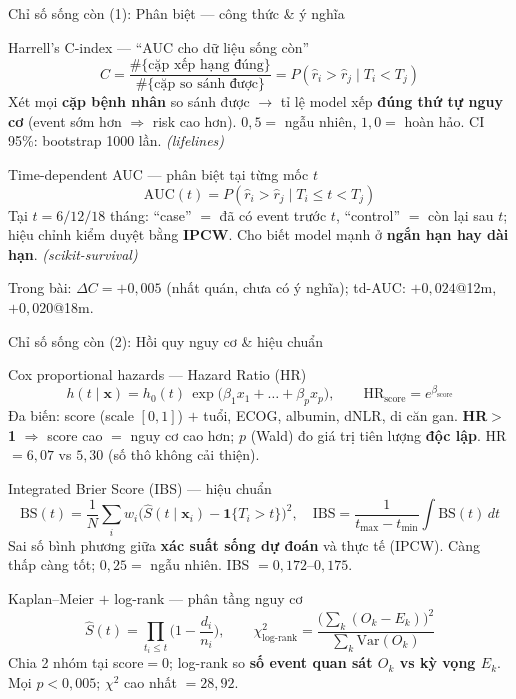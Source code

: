 \documentclass[aspectratio=169,11pt]{beamer}
\begin{document}
\begin{frame}{Chỉ số sống còn (1): Phân biệt --- công thức \& ý nghĩa}
  \small
  \begin{block}{Harrell's C-index --- ``AUC cho dữ liệu sống còn''}
    \[
      C=\frac{\#\{\text{cặp xếp hạng đúng}\}}{\#\{\text{cặp so sánh được}\}}
       = P\!\left(\hat r_i>\hat r_j \mid T_i<T_j\right)
    \]
    Xét mọi \textbf{cặp bệnh nhân} so sánh được $\rightarrow$ tỉ lệ model xếp \textbf{đúng thứ tự nguy cơ}
    (event sớm hơn $\Rightarrow$ risk cao hơn). \;$0{,}5=$ ngẫu nhiên, $1{,}0=$ hoàn hảo.
    CI 95\%: bootstrap 1000 lần. \hfill\textit{(lifelines)}
  \end{block}
  \begin{block}{Time-dependent AUC --- phân biệt tại từng mốc $t$}
    \[
      \mathrm{AUC}(t)=P\!\left(\hat r_i>\hat r_j \mid T_i\le t< T_j\right)
    \]
    Tại $t=6/12/18$ tháng: ``case'' $=$ đã có event trước $t$, ``control'' $=$ còn lại sau $t$;
    hiệu chỉnh kiểm duyệt bằng \textbf{IPCW}. \;Cho biết model mạnh ở \textbf{ngắn hạn hay dài hạn}.
    \hfill\textit{(scikit-survival)}
  \end{block}
  \footnotesize\alert{Trong bài:} $\Delta C=+0{,}005$ (nhất quán, chưa có ý nghĩa); td-AUC: $+0{,}024$@12m, $+0{,}020$@18m.
\end{frame}

\begin{frame}{Chỉ số sống còn (2): Hồi quy nguy cơ \& hiệu chuẩn}
  \scriptsize
  \begin{block}{Cox proportional hazards --- Hazard Ratio (HR)}
    \[
      h(t\mid\mathbf{x})=h_0(t)\,\exp\!\big(\beta_1x_1+\dots+\beta_px_p\big),
      \qquad \mathrm{HR}_{\text{score}}=e^{\beta_{\text{score}}}
    \]
    Đa biến: score (scale $[0,1]$) $+$ tuổi, ECOG, albumin, dNLR, di căn gan.
    \textbf{HR$>$1} $\Rightarrow$ score cao $=$ nguy cơ cao hơn; $p$ (Wald) đo giá trị tiên lượng \textbf{độc lập}.
    \alert{HR $=6{,}07$ vs $5{,}30$ (số thô không cải thiện).}
  \end{block}
  \begin{block}{Integrated Brier Score (IBS) --- hiệu chuẩn}
    \[
      \mathrm{BS}(t)=\frac{1}{N}\sum_i w_i\big(\hat S(t\mid\mathbf{x}_i)-\mathbf{1}\{T_i>t\}\big)^2,
      \quad \mathrm{IBS}=\frac{1}{t_{\max}-t_{\min}}\!\int \mathrm{BS}(t)\,dt
    \]
    Sai số bình phương giữa \textbf{xác suất sống dự đoán} và thực tế (IPCW). Càng thấp càng tốt; $0{,}25=$ ngẫu nhiên.
    \alert{IBS $=0{,}172$–$0{,}175$.}
  \end{block}
  \begin{block}{Kaplan--Meier $+$ log-rank --- phân tầng nguy cơ}
    \[
      \hat S(t)=\!\!\prod_{t_i\le t}\!\Big(1-\frac{d_i}{n_i}\Big),
      \qquad \chi^2_{\text{log-rank}}=\frac{\big(\sum_k(O_k-E_k)\big)^2}{\sum_k \mathrm{Var}(O_k)}
    \]
    Chia 2 nhóm tại score$=0$; log-rank so \textbf{số event quan sát $O_k$ vs kỳ vọng $E_k$}.
    \alert{Mọi $p<0{,}005$; $\chi^2$ cao nhất $=28{,}92$.}
  \end{block}
\end{frame}
\end{document}
